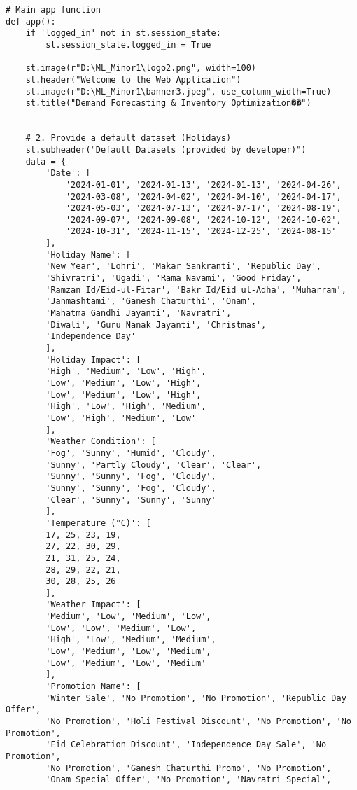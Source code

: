 \documentclass[10pt]{report}
\begin{document}
\begin{center}
\begin{lstlisting}
# Main app function
def app():
    if 'logged_in' not in st.session_state:
        st.session_state.logged_in = True 

    st.image(r"D:\ML_Minor1\logo2.png", width=100)
    st.header("Welcome to the Web Application")
    st.image(r"D:\ML_Minor1\banner3.jpeg", use_column_width=True)
    st.title("Demand Forecasting & Inventory Optimization��")

    
    # 2. Provide a default dataset (Holidays)
    st.subheader("Default Datasets (provided by developer)")
    data = {
        'Date': [
            '2024-01-01', '2024-01-13', '2024-01-13', '2024-04-26', 
            '2024-03-08', '2024-04-02', '2024-04-10', '2024-04-17', 
            '2024-05-03', '2024-07-13', '2024-07-17', '2024-08-19', 
            '2024-09-07', '2024-09-08', '2024-10-12', '2024-10-02', 
            '2024-10-31', '2024-11-15', '2024-12-25', '2024-08-15'
        ],
        'Holiday Name': [
        'New Year', 'Lohri', 'Makar Sankranti', 'Republic Day', 
        'Shivratri', 'Ugadi', 'Rama Navami', 'Good Friday', 
        'Ramzan Id/Eid-ul-Fitar', 'Bakr Id/Eid ul-Adha', 'Muharram', 
        'Janmashtami', 'Ganesh Chaturthi', 'Onam', 
        'Mahatma Gandhi Jayanti', 'Navratri', 
        'Diwali', 'Guru Nanak Jayanti', 'Christmas', 
        'Independence Day'
        ],
        'Holiday Impact': [
        'High', 'Medium', 'Low', 'High', 
        'Low', 'Medium', 'Low', 'High', 
        'Low', 'Medium', 'Low', 'High', 
        'High', 'Low', 'High', 'Medium', 
        'Low', 'High', 'Medium', 'Low'
        ],
        'Weather Condition': [
        'Fog', 'Sunny', 'Humid', 'Cloudy', 
        'Sunny', 'Partly Cloudy', 'Clear', 'Clear', 
        'Sunny', 'Sunny', 'Fog', 'Cloudy', 
        'Sunny', 'Sunny', 'Fog', 'Cloudy', 
        'Clear', 'Sunny', 'Sunny', 'Sunny'
        ],
        'Temperature (°C)': [
        17, 25, 23, 19, 
        27, 22, 30, 29, 
        21, 31, 25, 24, 
        28, 29, 22, 21, 
        30, 28, 25, 26
        ],
        'Weather Impact': [
        'Medium', 'Low', 'Medium', 'Low', 
        'Low', 'Low', 'Medium', 'Low', 
        'High', 'Low', 'Medium', 'Medium', 
        'Low', 'Medium', 'Low', 'Medium', 
        'Low', 'Medium', 'Low', 'Medium'
        ],
        'Promotion Name': [
        'Winter Sale', 'No Promotion', 'No Promotion', 'Republic Day Offer', 
        'No Promotion', 'Holi Festival Discount', 'No Promotion', 'No Promotion', 
        'Eid Celebration Discount', 'Independence Day Sale', 'No Promotion', 
        'No Promotion', 'Ganesh Chaturthi Promo', 'No Promotion', 
        'Onam Special Offer', 'No Promotion', 'Navratri Special', 

\end{lstlisting}
\end{center}
\end{document}

